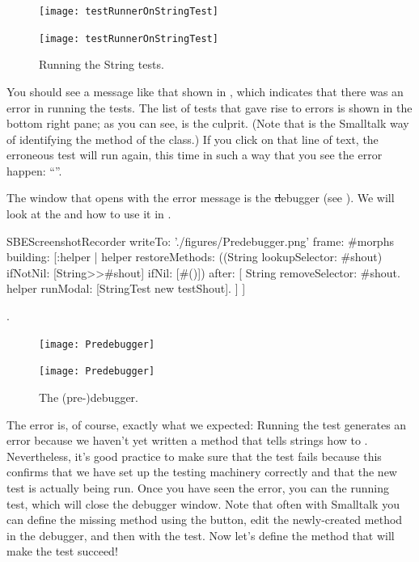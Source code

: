 \documentclass[a4paper,10pt,twoside]{book}
\begin{document}
\begin{figure}[hbt]
\ifluluelse
	{\centerline {\texttt{[image: testRunnerOnStringTest]}}}
	{\centerline {\texttt{[image: testRunnerOnStringTest]}}}
\caption{Running the String tests.
\label{fig:testRunnerTestShout}}
\end{figure}

You should see a message like that shown in , which indicates that there was an error in running the tests.
The list of tests that gave rise to errors is shown in the bottom right pane; as you can see,  is the culprit.
(Note that  is the Smalltalk way of identifying the  method of the  class.)
If you click on that line of text, the erroneous test will run again, this time in such a way that you see the error happen: ``''.

The window that opens with the error message is the \st debugger (see ).
We will look at the  and how to use it in .

\begin{ExecuteSmalltalkScript}
SBEScreenshotRecorder writeTo: './figures/Predebugger.png' frame: #morphs building: [:helper |
	helper restoreMethods: ((String lookupSelector: #shout) ifNotNil: [{String>>#shout}] ifNil: [#()]) after: [
		String removeSelector: #shout.
		helper runModal: [StringTest new testShout].
	]
]
\end{ExecuteSmalltalkScript}.
\begin{figure}[hbt]
\ifluluelse
	{\centerline {\texttt{[image: Predebugger]}}}
	{\centerline {\texttt{[image: Predebugger]}}}
\caption{The (pre-)debugger.}
\label{fig:predebugger}
\end{figure}

The error is, of course, exactly what we expected:
Running the test generates an error because we haven't yet written a method that tells strings how to .
Nevertheless, it's good practice to make sure that the test fails because this confirms that we have set up the testing machinery correctly and that the new test is actually being run.
Once you have seen the error, you can  the running test, which will close the debugger window.
Note that often with Smalltalk you can define the missing method using the  button, edit the newly-created method in the debugger, and then  with the test.
Now let's define the method that will make the test succeed!
\end{document}
